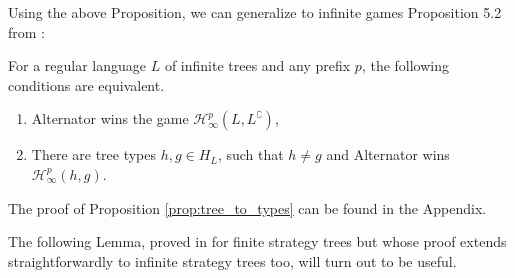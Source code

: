 Using the above Proposition, we can generalize to infinite games Proposition 5.2 from \cite{bp}:
\begin{proposition}\label{prop:tree_to_types}
 For a regular language $L$ of infinite trees and any prefix $p$, the following conditions are equivalent.
 \begin{enumerate}
\item Alternator wins the game $\mathcal{H}^p_\infty(L, L^\complement)$, 
 \item  There are tree types $h, g\in H_L$, such that $h\neq g$ and Alternator wins $\mathcal{H}^p_\infty(h, g)$.
 \end{enumerate}
\end{proposition}
The proof of Proposition \ref{prop:tree_to_types} can be found in the Appendix.

The following Lemma, proved in \cite{bp} for finite strategy trees but whose proof extends straightforwardly to infinite strategy trees too, will turn out to be useful.%

